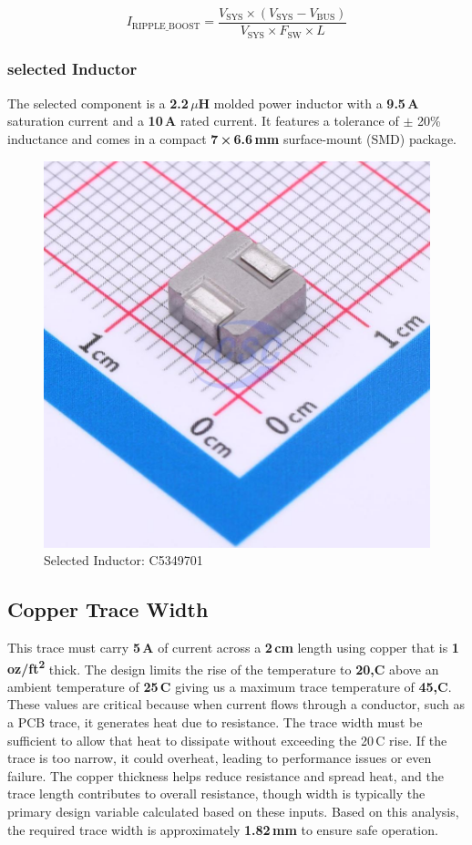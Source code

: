 \documentclass[12pt]{article}
\begin{document}
\begin{equation}
I_{\text{RIPPLE\_BOOST}} = \frac{V_{\text{SYS}} \times (V_{\text{SYS}} - V_{\text{BUS}})}{V_{\text{SYS}} \times F_{\text{SW}} \times L}
\label{equ:Inductor-boost-ripple}
\end{equation}

\subsubsection{selected Inductor}
The selected component is a \textbf{2.2\,\(\mu\)H} molded power inductor with a \textbf{9.5\,A} saturation current and a \textbf{10\,A} rated current. It features a tolerance of \(\pm\) 20\% inductance and comes in a compact \textbf{7\,×\,6.6\,mm} surface-mount (SMD) package.

\begin{figure}[H]
    \centering
    \includegraphics[width=.3\linewidth]{20230201_APV-APH0630T2R2M_C5349701_back.jpg}
    \caption{Selected Inductor: C5349701}
    \label{img:selected-inductor}
\end{figure}

\subsection{Copper Trace Width}
This trace must carry \textbf{5\,A} of current across a \textbf{2\,cm} length using copper that is \textbf{1\,oz/ft\textsuperscript{2}} thick. 
The design limits the rise of the temperature to \textbf{ 20,\textdegree C} above an ambient temperature of \textbf{25\,\textdegree C} giving us a maximum trace temperature of \textbf{ 45,\textdegree C}. 
These values are critical because when current flows through a conductor, such as a PCB trace, it generates heat due to resistance. 
The trace width must be sufficient to allow that heat to dissipate without exceeding the 20\,\textdegree C rise. 
If the trace is too narrow, it could overheat, leading to performance issues or even failure. 
The copper thickness helps reduce resistance and spread heat, and the trace length contributes to overall resistance, 
though width is typically the primary design variable calculated based on these inputs.
Based on this analysis, the required trace width is approximately \textbf{1.82\,mm} to ensure safe operation.
\end{document}
